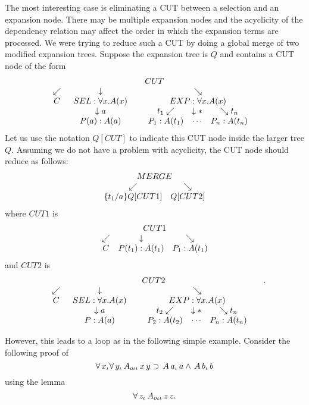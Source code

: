 The most interesting case is eliminating a CUT between
a selection and an expansion node.  There may be
multiple expansion nodes and the acyclicity of the dependency
relation may affect the order in which the expansion terms
are processed.  We were trying to reduce such a CUT
by doing a global merge of two modified expansion trees.
Suppose the expansion tree is $Q$ and contains a CUT node
of the form
$$\etrca{CUT}{}{C}{}{\sel{}{\forall x . A(x)}{a}{P(a):A(a)}}{}
{\gexpnode{}{\forall x . A(x)}{t_1}{P_1:A(t_1)}{t_n}{P_n:A(t_n)}}$$
Let us use the notation $Q[CUT]$ to indicate this CUT node inside the
larger tree $Q$.
Assuming we do not have a problem with acyclicity, the CUT node
should reduce as follows:
$${\begin{array}[t]{c}MERGE \\ \begin{array}[t]{cc}  \swarrow & \searrow  \\ \{t_1/a\} Q[CUT1] & Q[CUT2] \end{array}\end{array}}$$
where $CUT1$ is
$${\begin{array}[t]{c}CUT1 \\ \begin{array}[t]{ccc}  \swarrow & \downarrow  & \searrow  \\ C & P(t_1):A(t_1) & P_1:A(t_1) \end{array}\end{array}}$$
and $CUT2$ is
$$\etrca{CUT2}{}{C}{}{\sel{}{\forall x . A(x)}{a}{P:A(a)}}{}
{\gexpnode{}{\forall x . A(x)}{t_2}{P_2:A(t_2)}{t_n}{P_n:A(t_n)}}.$$

However, this leads to a loop as in the following simple example.
Consider the following proof of 
$$ \forall \,x_{\iota} \forall \,y_{\iota} \,A_{o\iota\iota} \,x \,y \supset \,A \,a_{\iota} \,a \land \,A \,b_{\iota} \,b$$
using the lemma
$$ \forall \,z_{\iota} \,A_{o\iota\iota} \,z \,z.$$

\vbox{\indent
{}\turnstile{}\lastformula{}
}\filbreak
\vbox{\indent
{}\turnstile{}\lastformula{}
}\filbreak
\vbox{\indent
{}\turnstile{}\lastformula{}
}\filbreak
\vbox{\indent
{}\turnstile{}\lastformula{}
}\filbreak
\vbox{\indent
{}\turnstile{}\lastformula{}
}\filbreak
\vbox{\indent
{}\turnstile{}\lastformula{}
}\filbreak
\vbox{\indent
{}\turnstile{}\lastformula{}
}\filbreak
\vbox{\indent
{}\hypnumbox {}\turnstile{}\lastformula{}
}\filbreak


